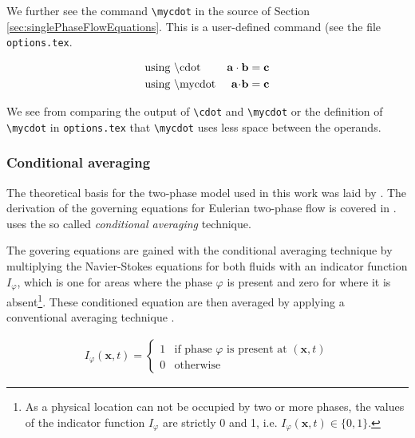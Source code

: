 We further see the command \verb+\mycdot+ in the source of Section \ref{sec:singlePhaseFlowEquations}. 
This is a user-defined command (see the file \verb+options.tex+.

\begin{align}
	&\text{using \textbackslash{}cdot} 		& \mathbf{a} \cdot \mathbf{b} &= \mathbf{c} \\
	&\text{using \textbackslash{}mycdot} 	& \mathbf{a} \kern-.2em\cdot\kern-.2em \mathbf{b} &= \mathbf{c} \\
\end{align}

We see from comparing the output of \verb+\cdot+ and \verb+\mycdot+ or the definition of 
\verb+\mycdot+ in \verb+options.tex+ that \verb+\mycdot+ uses less space between the operands.




\subsubsection{Conditional averaging}

The theoretical basis for the two-phase model used in this work was laid by \citet{weller1993}. 
The derivation of the governing equations for Eulerian two-phase flow is covered in 
\cite{hill1998,rusche2002,openCFD2005}. \citet{weller1993} uses the so called 
\emph{conditional averaging} technique.

The govering equations are gained with the conditional averaging technique by multiplying 
the Navier-Stokes equations for both fluids with an indicator function $I_\varphi$, which is one 
for areas where the phase $\varphi$ is present and zero for where it is 
absent\footnote{As a physical location can not be occupied by two or more phases, the values 
of the indicator function $I_\varphi$ are strictly 0 and 1, i.e. $I_\varphi(\mathbf{x},t) \in \{0,1\}$.}. 
These conditioned equation are then averaged by applying a conventional averaging technique 
\cite{weller1993}.


\begin{gather}
	I_\varphi(\mathbf{x},t) = \begin{cases}
		1	& \text{if phase $\varphi$ is present at } (\mathbf{x},t) \\
		0	& \text{otherwise}
	\end{cases}
\end{gather}

